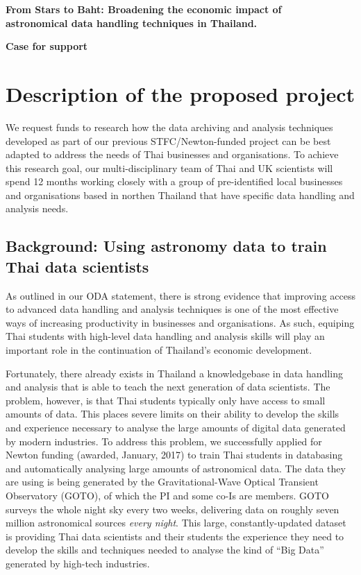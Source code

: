 \documentclass[11pt]{article}
\begin{document}
\setcounter{figure}{0}
\noindent
{\LARGE \bf From Stars to Baht: Broadening the economic impact of \\
astronomical data handling techniques in Thailand.}

\vspace{3mm}

\noindent
{\LARGE \bf Case for support}
\section{Description of the proposed project}
\noindent
We request funds to research how the data archiving and analysis techniques developed as part of our previous STFC/Newton-funded project can be best adapted to address the needs of Thai businesses and organisations. To achieve this research goal, our multi-disciplinary team of Thai and UK scientists will spend 12 months working closely with a group of pre-identified local businesses and organisations based in northen Thailand that have specific data handling and analysis needs.

\subsection{Background: Using astronomy data to train Thai data scientists}
As outlined in our ODA statement, there is strong evidence that improving access to advanced data handling and analysis techniques is one of the most effective ways of increasing productivity in businesses and organisations. As such, equiping Thai students with high-level data handling and analysis skills will play an important role in the continuation of Thailand's economic development.

\vspace{2mm}
\noindent
Fortunately, there already exists in Thailand a knowledgebase in data handling and analysis that is able to teach the next generation of data scientists. The problem, however, is that Thai students typically only have access to small amounts of data. This places severe limits on their ability to develop the skills and experience necessary to analyse the large amounts of digital data generated by modern industries. To address this problem, we successfully applied for Newton funding (awarded, January, 2017) to train Thai students in databasing and automatically analysing large amounts of astronomical data. The data they are using is being generated by the Gravitational-Wave Optical Transient Observatory (GOTO), of which the PI and some co-Is are members. GOTO surveys the whole night sky every two weeks, delivering data on roughly seven million astronomical sources {\it every night}. This large, constantly-updated dataset is providing Thai data scientists and their students the experience they need to develop the skills and techniques needed to analyse the kind of ``Big Data'' generated by high-tech industries.
\end{document}
